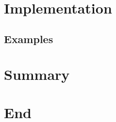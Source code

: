 \documentclass[]{beamer}
\begin{document}
\section{Implementation}
\transition

\subsection{Examples}


\section{Summary}
\transition


\section*{End}
\thankyou


\appendix
{}
\end{document}

